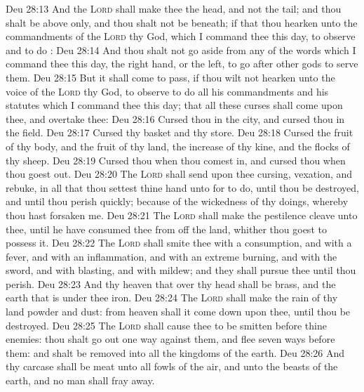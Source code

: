 \vs Deu 28:13 And the \textsc{Lord} shall make thee the head, and not the tail; and thou shalt be above only, and thou shalt not be beneath; if that thou hearken unto the commandments of the \textsc{Lord} thy God, which I command thee this day, to observe and to do :
\vs Deu 28:14 And thou shalt not go aside from any of the words which I command thee this day,  the right hand, or  the left, to go after other gods to serve them.
\vs Deu 28:15 But it shall come to pass, if thou wilt not hearken unto the voice of the \textsc{Lord} thy God, to observe to do all his commandments and his statutes which I command thee this day; that all these curses shall come upon thee, and overtake thee:
\vs Deu 28:16 Cursed  thou  in the city, and cursed  thou  in the field.
\vs Deu 28:17 Cursed  thy basket and thy store.
\vs Deu 28:18 Cursed  the fruit of thy body, and the fruit of thy land, the increase of thy kine, and the flocks of thy sheep.
\vs Deu 28:19 Cursed  thou  when thou comest in, and cursed  thou  when thou goest out.
\vs Deu 28:20 The \textsc{Lord} shall send upon thee cursing, vexation, and rebuke, in all that thou settest thine hand unto for to do, until thou be destroyed, and until thou perish quickly; because of the wickedness of thy doings, whereby thou hast forsaken me.
\vs Deu 28:21 The \textsc{Lord} shall make the pestilence cleave unto thee, until he have consumed thee from off the land, whither thou goest to possess it.
\vs Deu 28:22 The \textsc{Lord} shall smite thee with a consumption, and with a fever, and with an inflammation, and with an extreme burning, and with the sword, and with blasting, and with mildew; and they shall pursue thee until thou perish.
\vs Deu 28:23 And thy heaven that  over thy head shall be brass, and the earth that is under thee  iron.
\vs Deu 28:24 The \textsc{Lord} shall make the rain of thy land powder and dust: from heaven shall it come down upon thee, until thou be destroyed.
\vs Deu 28:25 The \textsc{Lord} shall cause thee to be smitten before thine enemies: thou shalt go out one way against them, and flee seven ways before them: and shalt be removed into all the kingdoms of the earth.
\vs Deu 28:26 And thy carcase shall be meat unto all fowls of the air, and unto the beasts of the earth, and no man shall fray  away.

